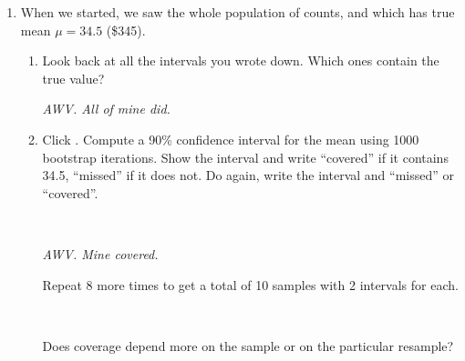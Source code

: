 \begin{enumerate}
\item When we started, we saw the whole population of counts, and 
    which has true mean  $\mu = 34.5$ (\$345).
    \begin{enumerate}
    \item  Look back at all the intervals you wrote down.  Which ones
      contain the true value?
\begin{students}
        \vspace{2cm}        
\end{students}
\begin{key}
  {\it AWV. All of mine did.}
\end{key}

\item Click .  Compute a 90\%
  confidence interval for the mean using 1000 bootstrap
  iterations. Show the interval and write ``covered'' if it contains
  34.5, ``missed'' if it does not.  Do  again, write the
  interval and ``missed'' or ``covered''.
\begin{students}
        \vspace{2cm}\\        
\end{students}
\begin{key}
  {\it AWV. Mine covered.}
\end{key}
   Repeat 8 more times to get a total of 10 samples with 2 intervals
   for each.
\begin{students}
        \vspace{3cm} \\       
\end{students}
   Does coverage depend more on the sample or on the particular resample?


\end{enumerate}
\end{enumerate}
